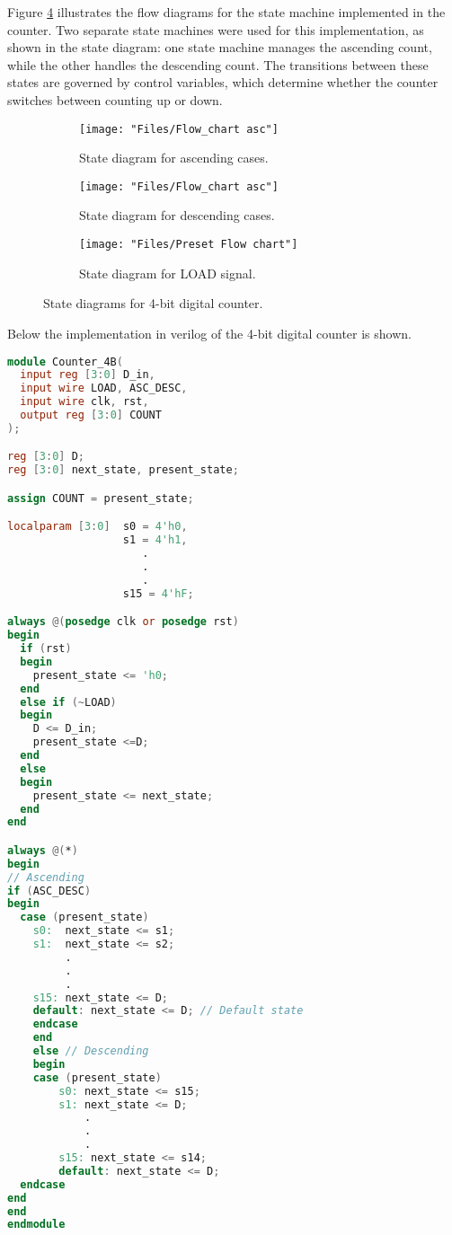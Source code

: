 \documentclass[conference]{IEEEtran}
\begin{document}
	
	Figure \ref{fig:state_diagram} illustrates the flow diagrams for the state machine implemented in the counter. Two separate state machines were used for this implementation, as shown in the state diagram: one state machine manages the ascending count, while the other handles the descending count. The transitions between these states are governed by control variables, which determine whether the counter switches between counting up or down.
	\begin{figure}[H]
		\begin{subfigure}[b]{\columnwidth}
			\centering
			\texttt{[image: "Files/Flow\_chart asc"]}
			\caption{State diagram for ascending cases.}
			\label{fig:flowchart-asc}
		\end{subfigure}
		\vspace*{1cm}
		\begin{subfigure}[b]{\columnwidth}
			\centering
			\texttt{[image: "Files/Flow\_chart asc"]}
			\caption{State diagram for descending cases.}
			\label{fig:flowchart-desc}
		\end{subfigure}
		\begin{subfigure}[b]{\columnwidth}
			\centering
			\texttt{[image: "Files/Preset Flow chart"]}
			\caption{State diagram for LOAD signal.}
			\label{fig:preset-flow-chart}
		\end{subfigure}
		
		
		\caption{State diagrams for 4-bit digital counter.}
		\label{fig:state_diagram}
	\end{figure}
	
	Below the implementation in verilog of the 4-bit digital counter is shown.
	
	\begin{lstlisting}[language=Verilog, 
		caption={2 bit full adder code hardware description in verilog.}, 
		label={code:FA_2B_Code}]
module Counter_4B(
  input reg [3:0] D_in,
  input wire LOAD, ASC_DESC,
  input wire clk, rst,
  output reg [3:0] COUNT
);

reg [3:0] D;
reg [3:0] next_state, present_state;

assign COUNT = present_state;

localparam [3:0]  s0 = 4'h0,
                  s1 = 4'h1,
                     .
                     .
                     .
                  s15 = 4'hF;

always @(posedge clk or posedge rst) 
begin
  if (rst) 
  begin
    present_state <= 'h0;
  end 
  else if (~LOAD) 
  begin
    D <= D_in;
    present_state <=D;
  end 
  else 
  begin
    present_state <= next_state;
  end
end

always @(*)
begin
// Ascending
if (ASC_DESC) 
begin
  case (present_state)
	s0:  next_state <= s1;
	s1:  next_state <= s2;
	     .
	     .
	     .
	s15: next_state <= D;
	default: next_state <= D; // Default state
    endcase 
    end 
    else // Descending
    begin
    case (present_state)
        s0: next_state <= s15;
        s1: next_state <= D;
            .
            .
            .
        s15: next_state <= s14;
        default: next_state <= D;
  endcase
end
end
endmodule
	\end{lstlisting}
	
\end{document}
